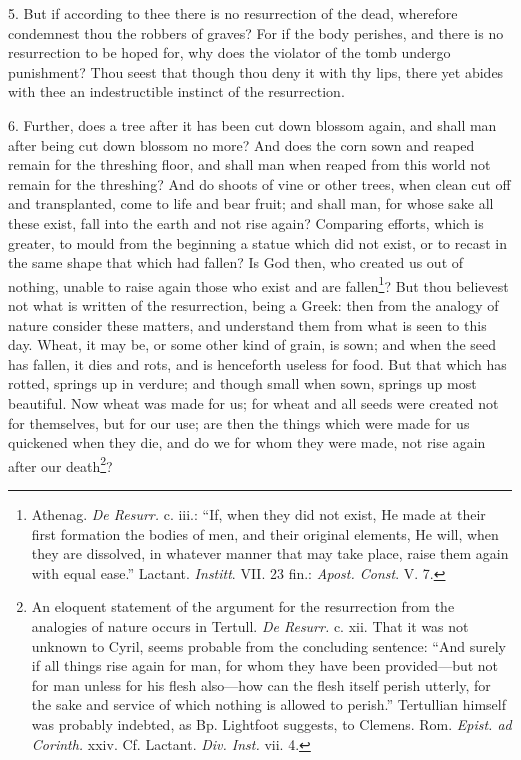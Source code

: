 5. But if according to thee there is no resurrection of the dead, wherefore condemnest thou the robbers of graves? For if the body perishes, and there is no resurrection to be hoped for, why does the violator of the tomb undergo punishment? Thou seest that though thou deny it with thy lips, there yet abides with thee an indestructible instinct of the resurrection.

6. Further, does a tree after it has been cut down blossom again, and shall man after being cut down blossom no more? And does the corn sown and reaped remain for the threshing floor, and shall man when reaped from this world not remain for the threshing? And do shoots of vine or other trees, when clean cut off and transplanted, come to life and bear fruit; and shall man, for whose sake all these exist, fall into the earth and not rise again? Comparing efforts, which is greater, to mould from the beginning a statue which did not exist, or to recast in the same shape that which had fallen? Is God then, who created us out of nothing, unable to raise again those who exist and are fallen\footnote{Athenag. \emph{De Resurr.} c. iii.: “If, when they did not exist, He made at their first formation the bodies of men, and their original elements, He will, when they are dissolved, in whatever manner that may take place, raise them again with equal ease.” Lactant. \emph{Institt}. VII. 23 fin.: \emph{Apost. Const}. V. 7.}? But thou believest not what is written of the resurrection, being a Greek: then from the analogy of nature consider these matters, and understand them from what is seen to this day. Wheat, it may be, or some other kind of grain, is sown; and when the seed has fallen, it dies and rots, and is henceforth useless for food. But that which has rotted, springs up in verdure; and though small when sown, springs up most beautiful. Now wheat was made for us; for wheat and all seeds were created not for themselves, but for our use; are then the things which were made for us quickened when they die, and do we for whom they were made, not rise again after our death\footnote{An eloquent statement of the argument for the resurrection from the analogies of nature occurs in Tertull. \emph{De Resurr.} c. xii. That it was not unknown to Cyril, seems probable from the concluding sentence: “And surely if all things rise again for man, for whom they have been provided—but not for man unless for his flesh also—how can the flesh itself perish utterly, for the sake and service of which nothing is allowed to perish.” Tertullian himself was probably indebted, as Bp. Lightfoot suggests, to Clemens. Rom. \emph{Epist. ad Corinth.} xxiv. Cf. Lactant. \emph{Div. Inst.} vii. 4.}?

